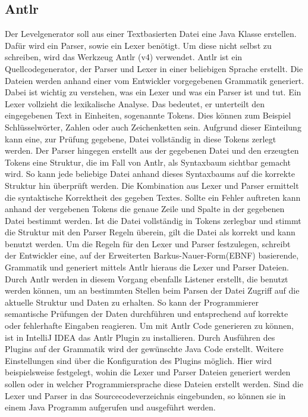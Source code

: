 \subsection{Antlr}

Der Levelgenerator soll aus einer Textbasierten Datei eine Java Klasse erstellen. Dafür wird ein Parser, sowie ein Lexer benötigt. Um diese nicht selbst zu schreiben, wird das Werkzeug Antlr (v4) verwendet.\newline
Antlr ist ein Quellcodegenerator, der Parser und Lexer in einer beliebigen Sprache erstellt. Die Dateien werden anhand einer vom Entwickler vorgegebenen Grammatik generiert. %
\newline
Dabei ist wichtig zu verstehen, was ein Lexer und was ein Parser ist und tut. \newline
Ein Lexer vollzieht die lexikalische Analyse. Das bedeutet, er unterteilt den eingegebenen Text in Einheiten, sogenannte Tokens. Dies können zum Beispiel Schlüsselwörter, Zahlen oder auch Zeichenketten sein. Aufgrund dieser Einteilung kann eine, zur Prüfung gegebene, Datei vollständig in diese Tokens zerlegt werden. 
\newline
Der Parser hingegen erstellt aus der gegebenen Datei und den erzeugten Tokens eine Struktur, die im Fall von Antlr, als Syntaxbaum sichtbar gemacht wird. So kann jede beliebige Datei anhand dieses Syntaxbaums auf die korrekte Struktur hin überprüft werden. %
\newline
Die Kombination aus Lexer und Parser ermittelt die syntaktische Korrektheit des gegeben Textes. Sollte ein Fehler auftreten kann anhand der vergebenen Tokens die genaue Zeile und Spalte in der gegebenen Datei bestimmt werden. Ist die Datei vollständig in Tokens zerlegbar und stimmt die Struktur mit den Parser Regeln überein, gilt die Datei als korrekt und kann benutzt werden.\newline
Um die Regeln für den Lexer und Parser festzulegen, schreibt der Entwickler eine, auf der Erweiterten Barkus-Nauer-Form(EBNF) basierende, Grammatik und generiert mittels Antlr hieraus die Lexer und Parser Dateien. Durch Antlr werden in diesem Vorgang ebenfalls Listener erstellt, die benutzt werden können, um an bestimmten Stellen beim Parsen der Datei Zugriff auf die aktuelle Struktur und Daten zu erhalten. So kann der Programmierer semantische Prüfungen der Daten durchführen und entsprechend auf korrekte oder fehlerhafte Eingaben reagieren.\newline
Um mit Antlr Code generieren zu können, ist in IntelliJ IDEA das Antlr Plugin zu installieren. Durch Ausführen des Plugins auf der Grammatik wird der gewünschte Java Code erstellt.\newline
Weitere Einstellungen sind über die Konfiguration des Plugins möglich. Hier wird beispielsweise festgelegt, wohin die Lexer und Parser Dateien generiert werden sollen oder in welcher Programmiersprache diese Dateien erstellt werden. 
Sind die Lexer und Parser in das Sourcecodeverzeichnis eingebunden, so können sie in einem Java Programm aufgerufen und ausgeführt werden.\newline
